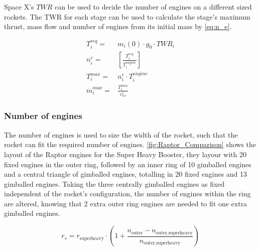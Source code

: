 Space X's $TWR$ can be used to decide the number of engines on a different sized rockets. The TWR for each stage can be used to calculate the stage's maximum thrust, mass flow and number of engines from its initial mass by \autoref{eq:n_e}.


\begin{equation}
\begin{aligned}
    T^{req}_i =&  m_i(0) \cdot g_0 \cdot TWR_i\\
    n^e_i =& [\frac{T^{req}_i}{T^{engine}_i}] \\
    T^{max}_i =& n^e_i \cdot T^{engine}_i \\
    \dot{m}_i^{max} =& \frac{T^{max}_i}{v_{ex}^i}
\end{aligned}
\label{eq:n_e}
\end{equation}



\subsubsection{Number of engines}
The number of engines is used to size the width of the rocket, such that the rocket can fit the required number of engines. \autoref{fig:Raptor_Comparison} shows the layout of the Raptor engines for the Super Heavy Booster, they layour with 20 fixed engines in the outer ring, followed by an inner ring of 10 gimballed engines and a central triangle of gimballed engines, totalling in 20 fixed engines and 13 gimballed engines. Taking the three centrally gimballed engines as fixed independent of the rocket's configuration, the number of engines within the ring are altered, knowing that 2 extra outer ring engines are needed to fit one extra gimballed engines.

\begin{equation}
    r_r = r_{\text{superheavy}} \cdot (1 + \frac{n_{\text{outer}} - n_{\text{outer,superheavy}}}{n_{\text{outer,superheavy}}})
\end{equation}


